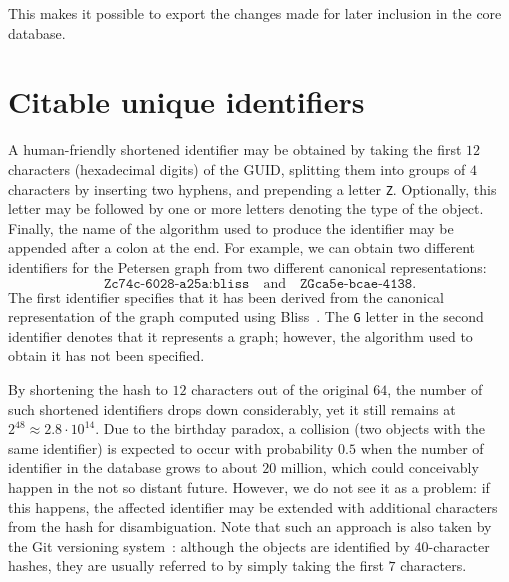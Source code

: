 \documentclass[12pt,a4paper]{article}
\begin{document}
This makes it possible to export the changes made
for later inclusion in the core database.

\section{Citable unique identifiers}

A human-friendly shortened identifier may be obtained
by taking the first $12$ characters (hexadecimal digits) of the GUID,
splitting them into groups of $4$ characters by inserting two hyphens,
and prepending a letter \texttt{Z}.
Optionally, this letter may be followed by one or more letters
denoting the type of the object.
Finally, the name of the algorithm used to produce the identifier
may be appended after a colon at the end.
For example, we can obtain two different identifiers for the Petersen graph
from two different canonical representations:
\begin{equation}
\texttt{Zc74c-6028-a25a:bliss} \quad \text{and} \quad \texttt{ZGca5e-bcae-4138}.
\end{equation}
The first identifier specifies that it has been derived
from the canonical representation of the graph
computed using Bliss~\cite{Bliss}.
The \texttt{G} letter in the second identifier
denotes that it represents a graph;
however, the algorithm used to obtain it has not been specified.

By shortening the hash to $12$ characters out of the original $64$,
the number of such shortened identifiers drops down considerably,
yet it still remains at $2^{48} \approx 2.8 \cdot 10^{14}$.
Due to the birthday paradox, a collision
(two objects with the same identifier)
is expected to occur with probability $0.5$
when the number of identifier in the database grows to about $20$ million,
which could conceivably happen in the not so distant future.
However, we do not see it as a problem:
if this happens, the affected identifier may be extended
with additional characters from the hash for disambiguation.
Note that such an approach
is also taken by the Git versioning system~\cite{git}:
although the objects are identified by $40$-character hashes,
they are usually referred to by simply taking the first $7$ characters.



\end{document}
